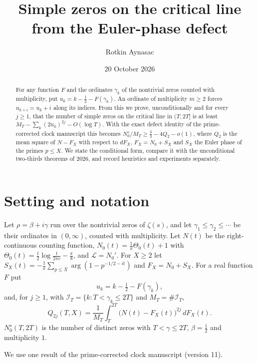 \documentclass[11pt,reqno]{amsart}
\numberwithin{equation}{section}
\theoremstyle{plain}
\theoremstyle{definition}
\theoremstyle{remark}
\begin{document}
\title{Simple zeros on the critical line from the Euler-phase defect}
\author{Rotkin Aynasac}
\date{20 October 2026}
\begin{abstract}
For any function $F$ and the ordinates $\gamma_k$ of the nontrivial zeros counted with multiplicity, put $u_k=k-\frac12-F(\gamma_k)$. An ordinate of multiplicity $m\ge2$ forces $u_{k+i}=u_k+i$ along its indices. From this we prove, unconditionally and for every $j\ge1$, that the number of simple zeros on the critical line in $(T,2T]$ is at least $M_T-\sum_k(2u_k)^{2j}-O(\log T)$. With the exact defect identity of the prime-corrected clock manuscript this becomes $N_0^s/M_T\ge\frac43-4Q_2-o(1)$, where $Q_2$ is the mean square of $N-F_X$ with respect to $dF_X$, $F_X=N_0+S_X$ and $S_X$ the Euler phase of the primes $p\le X$. We state the conditional form, compare it with the unconditional two-thirds theorems of 2026, and record heuristics and experiments separately.
\end{abstract}
\maketitle
\tableofcontents

\section{Setting and notation}\label{sec:setting}
Let $\rho=\beta+i\gamma$ run over the nontrivial zeros of $\zeta(s)$, and let $\gamma_1\le\gamma_2\le\cdots$ be their ordinates in $(0,\infty)$, counted with multiplicity. Let $N(t)$ be the right-continuous counting function, $N_0(t)=\frac1\pi\Theta_0(t)+1$ with $\Theta_0(t)=\frac t2\log\frac t{2\pi e}-\frac\pi8$, and $\mathcal L=N_0'$. For $X\ge2$ let $S_X(t)=-\frac1\pi\sum_{p\le X}\arg(1-p^{-1/2-it})$ and $F_X=N_0+S_X$. For a real function $F$ put
\begin{equation}\label{eq:defect}
u_k=k-\tfrac12-F(\gamma_k),
\end{equation}
and, for $j\ge1$, with $\mathcal I_T=\{k:T<\gamma_k\le2T\}$ and $M_T=\#\mathcal I_T$,
\begin{equation}\label{eq:Q}
Q_{2j}(T,X)=\frac1{M_T}\int_T^{2T}\bigl(N(t)-F_X(t)\bigr)^{2j}\,dF_X(t).
\end{equation}
$N_0^s(T,2T)$ is the number of distinct zeros with $T<\gamma\le2T$, $\beta=\frac12$ and multiplicity $1$.

We use one result of the prime-corrected clock manuscript (version 11).
\end{document}

